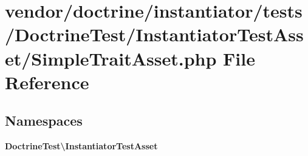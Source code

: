 \section{vendor/doctrine/instantiator/tests/\+Doctrine\+Test/\+Instantiator\+Test\+Asset/\+Simple\+Trait\+Asset.php File Reference}
\label{_simple_trait_asset_8php}
\subsection*{Namespaces}
\begin{DoxyCompactItemize}
\item 
 {\bf Doctrine\+Test\textbackslash{}\+Instantiator\+Test\+Asset}
\end{DoxyCompactItemize}
